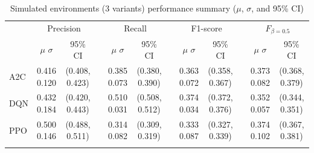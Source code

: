 \documentclass[12pt,oneside]{book}
\renewcommand{\arraystretch}{1.5}
\begin{document}
\begin{table}[htbp]
    \centering
    \caption{Simulated environments (3 variants) performance summary ($\mu$, $\sigma$, and 95\% CI)}
    \label{tab:a2-sim-summary}
    \setlength{\tabcolsep}{5pt}
    {\renewcommand{\arraystretch}{1.2}
    \begin{tabular}{@{}l cc c cc c cc c cc@{}}
        \arrayrulecolor{black!40}\toprule
        & \multicolumn{2}{c}{Precision} &  & \multicolumn{2}{c}{Recall} & & \multicolumn{2}{c}{F1-score} &  & \multicolumn{2}{c}{$F_{\beta=0.5}$} \\
        \cmidrule{2-3} \cmidrule{5-6} \cmidrule{8-9} \cmidrule{11-12}
        & \makecell{$\mu$ \\ $\sigma$} & 95\% CI & & \makecell{$\mu$ \\ $\sigma$} & 95\% CI & & \makecell{$\mu$ \\ $\sigma$} & 95\% CI & & \makecell{$\mu$ \\ $\sigma$} & 95\% CI \\ \midrule
        A2C & \makecell{0.416 \\ 0.120} & \makecell{(0.408,\\0.423)} & & \makecell{0.385 \\ 0.073} & \makecell{(0.380,\\0.390)} & & \makecell{0.363 \\ 0.072} & \makecell{(0.358,\\0.367)} & & \makecell{0.373 \\ 0.082} & \makecell{(0.368,\\0.379)} \\ \arrayrulecolor{gray!30}\midrule
        DQN & \makecell{0.432 \\ 0.184} & \makecell{(0.420,\\0.443)} & & \makecell{0.510 \\ 0.031} & \makecell{(0.508,\\0.512)} & & \makecell{0.374 \\ 0.034} & \makecell{(0.372,\\0.376)} & & \makecell{0.352 \\ 0.057} & \makecell{(0.344,\\0.351)} \\ \arrayrulecolor{gray!30}\midrule
        PPO & \makecell{0.500 \\ 0.146} & \makecell{(0.488,\\0.511)} & & \makecell{0.314 \\ 0.082} & \makecell{(0.309,\\0.319)} & & \makecell{0.333 \\ 0.087} & \makecell{(0.327,\\0.339)} & & \makecell{0.374 \\ 0.102} & \makecell{(0.367,\\0.381)} \\ \arrayrulecolor{gray!30}\midrule

\end{tabular}}
\end{table}
\end{document}
